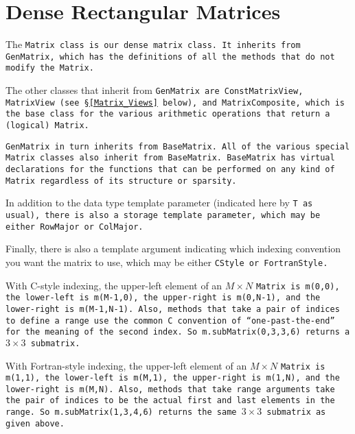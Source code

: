 
\section{Dense Rectangular Matrices}
\label{Matrix}

The \tt{Matrix} class is our dense matrix class.  It inherits from \tt{GenMatrix},
which has the definitions of all the methods that 
do not modify the \tt{Matrix}.

The other classes that inherit from \tt{GenMatrix} are \tt{ConstMatrixView},
\tt{MatrixView} (see \S\ref{Matrix_Views} below), and \tt{MatrixComposite}, which 
is the base class for the various arithmetic operations that return a 
(logical) \tt{Matrix}.  

\tt{GenMatrix} in turn inherits from \tt{BaseMatrix}.  All of the various
special \tt{Matrix} classes also inherit from \tt{BaseMatrix}.
\tt{BaseMatrix} has virtual declarations for the functions that can be 
performed on any kind of \tt{Matrix} regardless of its structure or sparsity.

In addition to the data type template parameter (indicated here by \tt{T} as usual),
there is also a storage template parameter, which may be either 
\tt{RowMajor} or \tt{ColMajor}.

Finally, there is also a template argument indicating which indexing convention
you want the matrix to use, which may be either \tt{CStyle} or 
\tt{FortranStyle}.

With C-style indexing, the upper-left element of an $M \times N$ \tt{Matrix} is
\tt{m(0,0)}, the lower-left is \tt{m(M-1,0)}, the upper-right is \tt{m(0,N-1)},
and the lower-right is \tt{m(M-1,N-1)}.  Also, methods that take a pair of 
indices to define a range use the common C convention of ``one-past-the-end'' 
for the meaning of the second index.
So \tt{m.subMatrix(0,3,3,6)} returns a $3 \times 3$ submatrix.

With Fortran-style indexing, the upper-left element of an $M \times N$ \tt{Matrix}
is \tt{m(1,1)}, the lower-left is \tt{m(M,1)}, the upper-right is \tt{m(1,N)},
and the lower-right is \tt{m(M,N)}.  Also, methods that take range arguments
take the pair of indices to be the actual first and last elements in the range.
So \tt{m.subMatrix(1,3,4,6)} returns the same $3 \times 3$ submatrix as given above.

